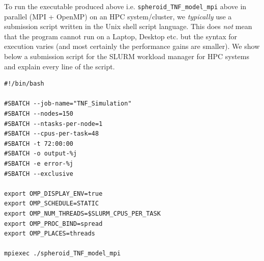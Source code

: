 \documentclass[12pt]{article}
\begin{document}
To run the executable produced above i.e. \texttt{spheroid\_TNF\_model\_mpi} above in parallel (MPI + OpenMP) on an HPC system/cluster, we \textit{typically} use a submission script written in the Unix shell script language. This does \textit{not} mean that the program cannot run on a Laptop, Desktop etc. but the syntax for execution varies (and most certainly the performance gains are smaller). We show below a submission script for the SLURM workload manager for HPC systems and explain every line of the script. 

\begin{verbatim}
#!/bin/bash

#SBATCH --job-name="TNF_Simulation"
#SBATCH --nodes=150
#SBATCH --ntasks-per-node=1
#SBATCH --cpus-per-task=48
#SBATCH -t 72:00:00
#SBATCH -o output-%j
#SBATCH -e error-%j
#SBATCH --exclusive

export OMP_DISPLAY_ENV=true
export OMP_SCHEDULE=STATIC
export OMP_NUM_THREADS=$SLURM_CPUS_PER_TASK
export OMP_PROC_BIND=spread
export OMP_PLACES=threads

mpiexec ./spheroid_TNF_model_mpi    
\end{verbatim}
\end{document}

